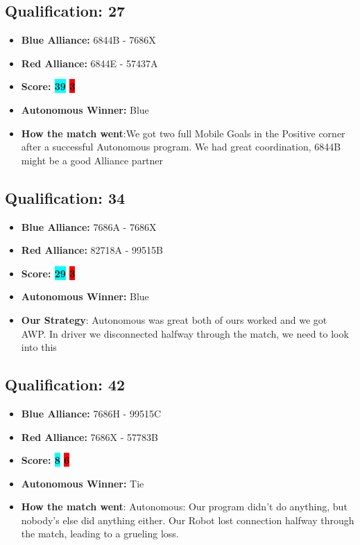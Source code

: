 \subsection*{Qualification: 27}

\begin{itemize}
    \item \textbf{Blue Alliance:} 6844B - 7686X
    \item \textbf{Red Alliance:} 6844E - 57437A
    \item \textbf{Score: \colorbox{cyan}{39} \colorbox{red}{3}}
    \item \textbf{Autonomous Winner:} Blue
    \item \textbf{How the match went}:We got two full Mobile Goals in the Positive corner after a successful Autonomous program. We had great coordination, 6844B might be a good Alliance partner
\end{itemize}

\subsection*{Qualification: 34}

\begin{itemize}
    \item \textbf{Blue Alliance:} 7686A - 7686X
    \item \textbf{Red Alliance:} 82718A - 99515B
    \item \textbf{Score: \colorbox{cyan}{29} \colorbox{red}{3}}
    \item \textbf{Autonomous Winner:} Blue
    \item \textbf{Our Strategy}: Autonomous was great both of ours worked and we got AWP. In driver we disconnected halfway through the match, we need to look into this

\end{itemize}

\subsection*{Qualification: 42}

\begin{itemize}
    \item \textbf{Blue Alliance:} 7686H - 99515C
    \item \textbf{Red Alliance:} 7686X - 57783B
    \item \textbf{Score: \colorbox{cyan}{8} \colorbox{red}{6}}
    \item \textbf{Autonomous Winner:} Tie
    \item \textbf{How the match went}: Autonomous: Our program didn't do anything, but nobody's else did anything either. Our Robot lost connection halfway through the match, leading to a grueling loss. 
\end{itemize}

